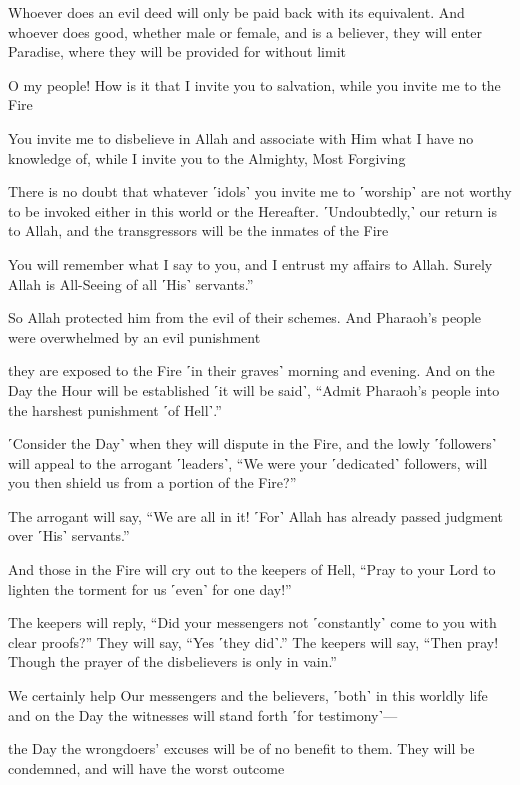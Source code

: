 Whoever does an evil deed will only be paid back with its equivalent. And whoever does good, whether male or female, and is a believer, they will enter Paradise, where they will be provided for without limit

O my people! How is it that I invite you to salvation, while you invite me to the Fire

You invite me to disbelieve in Allah and associate with Him what I have no knowledge of, while I invite you to the Almighty, Most Forgiving

There is no doubt that whatever ˹idols˺ you invite me to ˹worship˺ are not worthy to be invoked either in this world or the Hereafter. ˹Undoubtedly,˺ our return is to Allah, and the transgressors will be the inmates of the Fire

You will remember what I say to you, and I entrust my affairs to Allah. Surely Allah is All-Seeing of all ˹His˺ servants.”

So Allah protected him from the evil of their schemes. And Pharaoh’s people were overwhelmed by an evil punishment

they are exposed to the Fire ˹in their graves˺ morning and evening. And on the Day the Hour will be established ˹it will be said˺, “Admit Pharaoh’s people into the harshest punishment ˹of Hell˺.”

˹Consider the Day˺ when they will dispute in the Fire, and the lowly ˹followers˺ will appeal to the arrogant ˹leaders˺, “We were your ˹dedicated˺ followers, will you then shield us from a portion of the Fire?”

The arrogant will say, “We are all in it! ˹For˺ Allah has already passed judgment over ˹His˺ servants.”

And those in the Fire will cry out to the keepers of Hell, “Pray to your Lord to lighten the torment for us ˹even˺ for one day!”

The keepers will reply, “Did your messengers not ˹constantly˺ come to you with clear proofs?” They will say, “Yes ˹they did˺.” The keepers will say, “Then pray! Though the prayer of the disbelievers is only in vain.”

We certainly help Our messengers and the believers, ˹both˺ in this worldly life and on the Day the witnesses will stand forth ˹for testimony˺—

the Day the wrongdoers’ excuses will be of no benefit to them. They will be condemned, and will have the worst outcome

